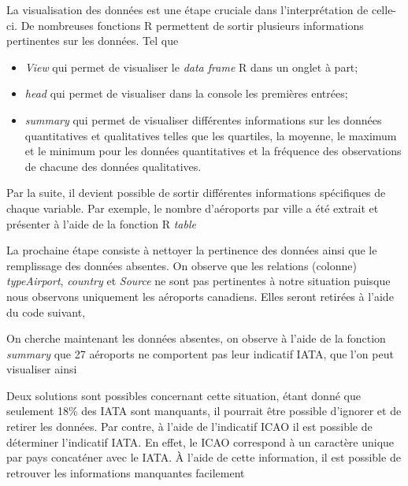 La visualisation des données est une étape cruciale dans l’interprétation de celle-ci. De nombreuses fonctions R permettent de sortir plusieurs informations pertinentes sur les données. Tel que
\begin{itemize}
\item \textit{View}\cite{Rfunction:View} qui permet de visualiser le \emph{data frame} R dans un onglet à part;
\item \textit{head} \cite{Rfunction:head} qui permet de visualiser dans la console les premières entrées;
\item \textit{summary}\cite{Rfunction:summary} qui permet de visualiser différentes informations sur les données quantitatives et qualitatives telles que les quartiles, la moyenne, le maximum et le minimum pour les données quantitatives  et la fréquence des observations de chacune des données qualitatives.
\end{itemize}
Par la suite, il devient possible de sortir différentes informations spécifiques de chaque variable. Par exemple, le nombre d'aéroports par ville a été extrait et présenter à l'aide de la fonction R \textit{table} \cite{Rfunction:table}
%
%


La prochaine étape consiste à nettoyer la pertinence des données ainsi que le remplissage des données absentes. On observe que les relations (colonne) \textit{typeAirport}, \textit{country} et \textit{Source} ne sont pas pertinentes à notre situation puisque nous observons uniquement les aéroports canadiens. Elles seront retirées à l'aide du code suivant,

%
%

On cherche maintenant les données absentes, on observe à l'aide de la fonction \emph{summary} que 27 aéroports ne comportent pas leur indicatif IATA, que l'on peut visualiser ainsi

%
%

Deux solutions sont possibles concernant cette situation, étant donné que seulement 18\% des IATA sont manquants, il pourrait être possible d'ignorer et de retirer les données. Par contre, à l'aide de l'indicatif ICAO il est possible de déterminer l'indicatif IATA. En effet, le ICAO correspond à un caractère unique par pays concaténer avec le IATA. À l'aide de cette information, il est possible de retrouver les informations manquantes facilement 


